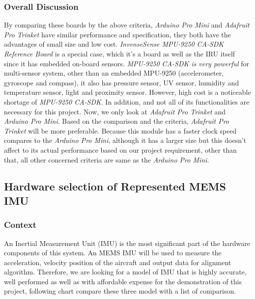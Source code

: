 \hfill \break
\subsubsection{Overall Discussion}
By comparing these boards by the above criteria, \textit{Arduino Pro Mini} and \textit{Adafruit Pro Trinket} have similar performance and specification, they both have the advantages of small size and low cost.
\textit{InvenseSense MPU-9250 CA-SDK Reference Board} is a special case, which it’s a board as well as the IRU itself since it has embedded on-board sensors.
\textit{MPU-9250 CA-SDK is very powerful} for multi-sensor system, other than an embedded MPU-9250 (accelerometer, gyroscope and compass), it also has pressure sensor, UV sensor, humidity and temperature sensor, light and proximity sensor.
However, high cost is a noticeable shortage of \textit{MPU-9250 CA-SDK}. In addition, and not all of its functionalities are necessary for this project.
Now, we only look at \textit{Adafruit Pro Trinket} and \textit{Arduino Pro Mini}. Based on the comparison and the criteria, \textit{Adafruit Pro Trinket} will be more preferable.
Because this module has a faster clock speed compares to the \textit{Arduino Pro Mini}, although it has a larger size but this doesn’t affect to its actual performance based on our project requirement, other than that, all other concerned criteria are same as the \textit{Arduino Pro Mini}.



\subsection{Hardware selection of Represented MEMS IMU}
\subsubsection{Context}
An Inertial Measurement Unit (IMU) is the most significant part of the hardware components of this system.
An MEMS IMU will be used to measure the acceleration, velocity position of the aircraft and output data for alignment algorithm.
Therefore, we are looking for a model of IMU that is highly accurate, well performed as well as with affordable expense for the demonstration of this project, following chart compare these three model with a list of comparison.\\

